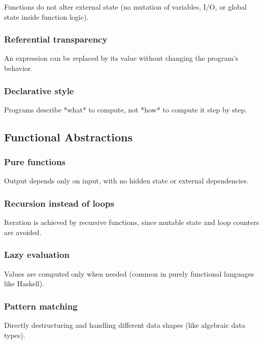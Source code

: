 \documentclass{viser-thesis}
\begin{document}
Functions do not alter external state (no mutation of variables, I/O, or global state inside function logic).

\subsubsection{Referential transparency}

An expression can be replaced by its value without changing the program’s behavior.

\subsubsection{Declarative style}

Programs describe *what* to compute, not *how* to compute it step by step.

\newpage

\subsection{Functional Abstractions}

\subsubsection{Pure functions}

Output depends only on input, with no hidden state or external dependencies.

\subsubsection{Recursion instead of loops}

Iteration is achieved by recursive functions, since mutable state and loop counters are avoided.

\subsubsection{Lazy evaluation}

Values are computed only when needed (common in purely functional languages like Haskell).

\subsubsection{Pattern matching}

Directly destructuring and handling different data shapes (like algebraic data types).
\end{document}
